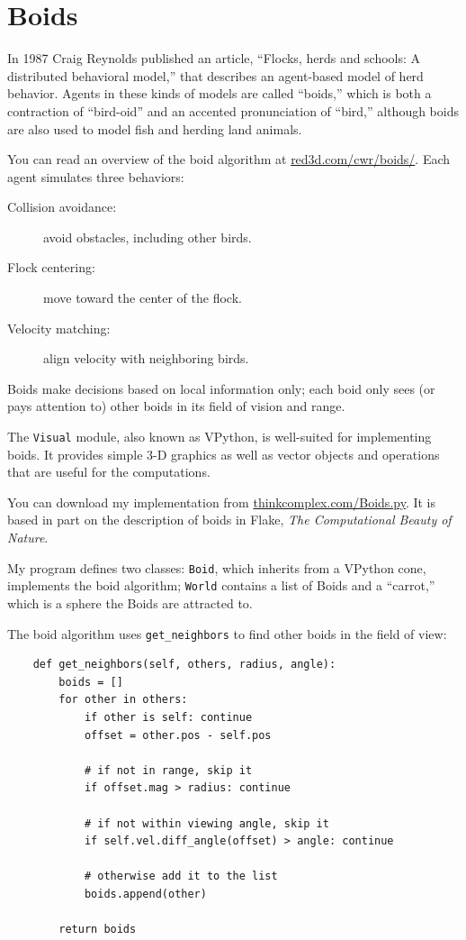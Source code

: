 \documentclass[10pt]{book}
\begin{document}
\section{Boids}

In 1987 Craig Reynolds published an article, ``Flocks, herds and
schools: A distributed behavioral model,'' that describes an
agent-based model of herd behavior.  Agents in these kinds of
models are called ``boids,'' which is both a contraction of
``bird-oid'' and an accented pronunciation of ``bird,'' although
boids are also used to model fish and herding land animals.

You can read an overview of the boid algorithm at
\url{red3d.com/cwr/boids/}.  Each agent simulates three
behaviors:

\begin{description}

\item[Collision avoidance:] avoid obstacles, including other birds.

\item[Flock centering:] move toward the center of the flock.

\item[Velocity matching:] align velocity with neighboring birds.

\end{description}

Boids make decisions based on local information only; each boid
only sees (or pays attention to) other boids in its field of
vision and range.

The {\tt Visual} module, also known as VPython, is well-suited
for implementing boids.  It provides simple 3-D graphics as
well as vector objects and operations that are useful for the
computations.

You can download my implementation from
\url{thinkcomplex.com/Boids.py}.  It is based in part
on the description of boids in Flake, {\em The Computational
Beauty of Nature}.

My program defines two classes: {\tt Boid}, which inherits from a
VPython cone, implements the boid algorithm; {\tt World}
contains a list of Boids and a ``carrot,'' which is a sphere
the Boids are attracted to.

The boid algorithm uses \verb"get_neighbors" to find other
boids in the field of view:

\begin{verbatim}
    def get_neighbors(self, others, radius, angle):
        boids = []
        for other in others:
            if other is self: continue
            offset = other.pos - self.pos
            
            # if not in range, skip it
            if offset.mag > radius: continue

            # if not within viewing angle, skip it
            if self.vel.diff_angle(offset) > angle: continue

            # otherwise add it to the list
            boids.append(other)
            
        return boids
\end{verbatim}
\end{document}
